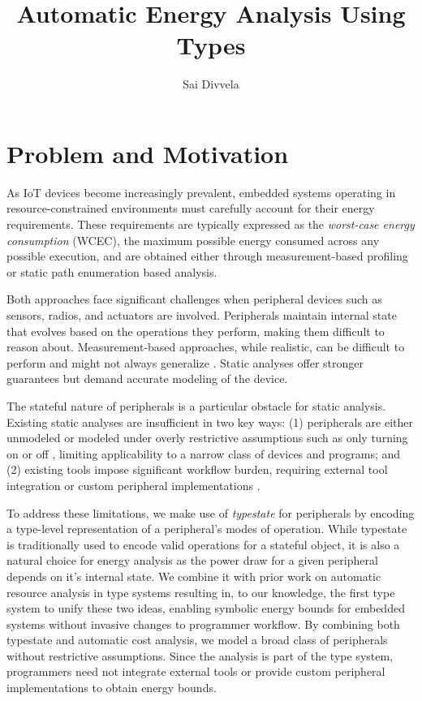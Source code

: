 \documentclass[sigconf, nonacm, screen]{acmart}
\begin{document}
\title{Automatic Energy Analysis Using Types}
\author{Sai Divvela}
\maketitle


\section{Problem and Motivation}
As IoT devices become increasingly prevalent, embedded systems operating in resource-constrained environments must carefully account for their energy requirements. These requirements are typically expressed as the \textit{worst-case energy consumption} (WCEC), the maximum possible energy consumed across any possible execution, and are obtained either through measurement-based profiling or static path enumeration based analysis.

Both approaches face significant challenges when peripheral devices such as sensors, radios, and actuators are involved. Peripherals maintain internal state that evolves based on the operations they perform, making them difficult to reason about. Measurement-based approaches, while realistic, can be difficult to perform and might not always generalize \cite{5993659, energy-analysis-np-hard}. Static analyses offer stronger guarantees but demand accurate modeling of the device.

The stateful nature of peripherals is a particular obstacle for static analysis. Existing static analyses are insufficient in two key ways: (1) peripherals are either unmodeled or modeled under overly restrictive assumptions such as only turning on or off \cite{raffeck_et_al_OASIcs_WCET_2019_4}, limiting applicability to a narrow class of devices and programs; and (2) existing tools impose significant workflow burden, requiring external tool integration or custom peripheral implementations \cite{woca}.

To address these limitations, we make use of \textit{typestate} for peripherals by encoding a type-level representation of a peripheral's modes of operation. While typestate is traditionally used to encode valid operations for a stateful object, it is also a natural choice for energy analysis as the power draw for a given peripheral depends on it's internal state. We combine it with prior work on automatic resource analysis in type systems \cite{Hoffmann_Jost_2022} resulting in, to our knowledge, the first type system to unify these two ideas, enabling symbolic energy bounds for embedded systems without invasive changes to programmer workflow. By combining both typestate and automatic cost analysis, we model a broad class of peripherals without restrictive assumptions. Since the analysis is part of the type system, programmers need not integrate external tools or provide custom peripheral implementations to obtain energy bounds.
\end{document}
